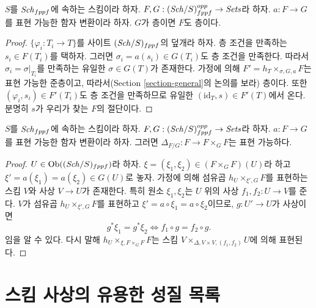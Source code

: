 \begin{lemma}
\label{lemma-representable-transformation-to-sheaf}
$S$를 $\mathit{Sch}_{fppf}$에 속하는 스킴이라 하자.
$F, G : (\mathit{Sch}/S)_{fppf}^{opp} \to \textit{Sets}$라 하자.
$a : F \to G$를 표현 가능한 함자 변환이라 하자.
$G$가 층이면 $F$도 층이다.
\end{lemma}

\begin{proof}
$\{\varphi_i : T_i \to T\}$를 사이트 $(\mathit{Sch}/S)_{fppf}$의 덮개라 하자.
층 조건을 만족하는 $s_i \in F(T_i)$를 택하자. 그러면
$\sigma_i = a(s_i) \in G(T_i)$도 층 조건을 만족한다. 따라서
$\sigma_i = \sigma|_{T_i}$를 만족하는 유일한 $\sigma \in G(T)$가
존재한다. 가정에 의해 $F' = h_T \times_{\sigma, G, a} F$는 표현 가능한
준층이고, 따라서(Section \ref{section-general}의 논의를 보라) 층이다.
또한 $(\varphi_i, s_i) \in F'(T_i)$도 층 조건을 만족하므로 유일한
$(\text{id}_T, s) \in F'(T)$에서 온다. 분명히 $s$가 우리가 찾는
$F$의 절단이다.
\end{proof}

\begin{lemma}
\label{lemma-representable-transformation-diagonal}
$S$를 $\mathit{Sch}_{fppf}$에 속하는 스킴이라 하자.
$F, G : (\mathit{Sch}/S)_{fppf}^{opp} \to \textit{Sets}$라 하자.
$a : F \to G$를 표현 가능한 함자 변환이라 하자.
그러면 $\Delta_{F/G} : F \to F \times_G F$는 표현 가능하다.
\end{lemma}

\begin{proof}
$U \in \mathop{\mathrm{Ob}}\nolimits((\mathit{Sch}/S)_{fppf})$라 하자.
$\xi = (\xi_1, \xi_2) \in (F \times_G F)(U)$라 하고
$\xi' = a(\xi_1) = a(\xi_2) \in G(U)$로 놓자. 가정에 의해 섬유곱
$h_U \times_{\xi', G} F$를 표현하는 스킴 $V$와 사상 $V \to U$가
존재한다. 특히 원소 $\xi_1, \xi_2$는 $U$ 위의 사상
$f_1, f_2 : U \to V$를 준다. $V$가 섬유곱
$h_U \times_{\xi', G} F$를 표현하고
$\xi' = a \circ \xi_1 = a \circ \xi_2$이므로,
$g : U' \to U$가 사상이면
$$
g^*\xi_1 = g^*\xi_2
\Leftrightarrow
f_1 \circ g = f_2 \circ g.
$$
임을 알 수 있다. 다시 말해 $h_U \times_{\xi, F \times_G F} F$는
스킴 $V \times_{\Delta, V \times V, (f_1, f_2)} U$에 의해 표현된다.
\end{proof}










\section{스킴 사상의 유용한 성질 목록}
\label{section-lists}


